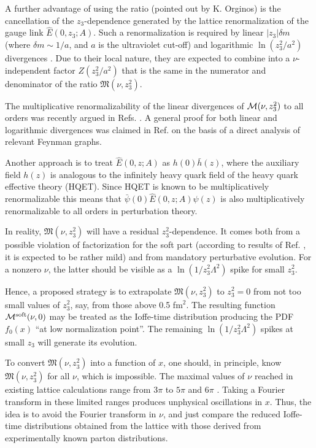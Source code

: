 \documentclass[aps,prd,twocolumn,showpacs,preprintnumbers,superscriptaddress,groupedaddress]{revtex4-1}
\begin{document}
 A further advantage  of using the ratio (pointed out by K. Orginos)  is 
the   cancellation of the   \mbox{$z_3$-dependence}   
 generated 
by the lattice  renormalization of 
the gauge link  ${ \hat E} (0,z_3; A)$. 
Such a renormalization is required by 
linear $|z_3| \delta m$ (where $\delta m \sim 1/a$, and $a$ is the ultraviolet cut-off)
and logarithmic $\ln (z_3^2/a^2)$ divergences  \cite{Polyakov:1980ca,Dotsenko:1979wb}. 
Due to their local nature, they  are expected to 
combine into a $\nu$-independent factor
$Z(z_3^2/a^2)$ that is   the same in the numerator and denominator 
of the ratio  ${\mathfrak M} (\nu, z_3^2) $. 




The   multiplicative renormalizability  of the linear 
divergences of ${\cal M} (\nu, z_3^2)$
to all orders 
was recently argued  in Refs. \cite{Ishikawa:2016znu,Chen:2016fxx}. 
A general proof for both linear and logarithmic divergences was claimed  in 
Ref. \cite{Ishikawa:2017faj} 
on the basis of  a direct analysis of relevant  Feynman graphs.

Another approach  \cite{Ji:2017oey,Green:2017xeu}  is to treat 
$ \hat E(0,z;A) $ as 
 $ h(0) \bar h (z) $,
 where the auxiliary field $h(z)$  is  analogous to the infinitely heavy
 quark field of the heavy quark effective  theory (HQET).
 Since HQET is known to be multiplicatively renormalizable \cite{Bagan:1993zv}
 this means that $\bar \psi(0)  \hat E(0,z;A) \psi (z)$ is also 
 multiplicatively renormalizable to all  orders in perturbation theory. 



 
In reality,  ${\mathfrak M} (\nu, z_3^2)$   will have 
a  residual \mbox{$z_3^2$-dependence.} 
 It comes   both 
from  a  possible 
violation of factorization for  the soft part  
(according to results of Ref. \cite{Musch:2010ka}, 
it is expected to be rather mild) and 
from  mandatory  perturbative  evolution. For a  nonzero $\nu$, 
the latter should be visible as a
$\ln (1/z_3^2 \Lambda^2)$  spike for small $z_3^2$.

Hence,  a proposed   strategy is  to extrapolate 
${\mathfrak M} (\nu, z_3^2)$ to $z_3^2=0$ from not too small
values of $z_3^2$, say,  from those above 0.5 fm$^2$.
 The resulting function  ${\cal M} ^{\rm soft}(\nu,0)$
may be treated as 
the Ioffe-time distribution producing the PDF $f_0(x)$ 
 ``at low normalization point''.  The remaining 
$\ln (1/z_3^2 \Lambda^2)$  spikes  at small $z_3$ will generate its evolution.


To  convert  ${\mathfrak M} (\nu, z_3^2)$ into a function of $x$, one should, in principle,
know  ${\mathfrak M} (\nu, z_3^2)$ for all $\nu$, which is  impossible.
The maximal values  of $\nu$ reached in existing lattice calculations 
range from $3\pi $ \cite{Lin:2014zya}     to $5\pi$   \cite{Alexandrou:2015rja}   and $6 \pi $  \cite{Orginos:2017kos}. 
Taking a Fourier transform in these limited ranges produces 
unphysical oscillations in $x$. 
Thus, the  idea is to avoid  the Fourier transform in $\nu$, 
and  just compare the reduced  Ioffe-time distributions obtained from the
 lattice   
with those derived from experimentally known parton distributions. 
\end{document}
